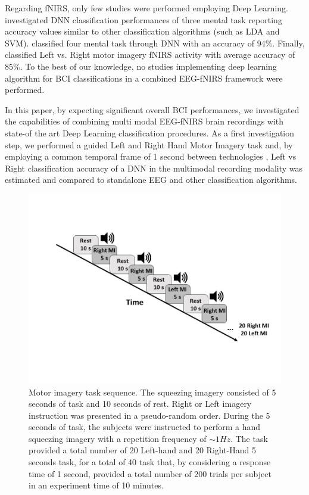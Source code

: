 \documentclass[12pt]{iopart}
\begin{document}
Regarding fNIRS, only  few  studies were performed employing Deep Learning.  \textcite{hennrich2015investigating} investigated DNN classification performances of three mental task reporting accuracy values similar  to other classification algorithms (such as LDA and SVM).  \textcite{abibullaev2011neural} classified four mental task through DNN with an accuracy of $94\%$. Finally, \textcite{nguyen2013temporal} classified Left vs. Right motor imagery fNIRS activity with average accuracy of $85\%$. To the best of our knowledge, no studies implementing deep learning algorithm for BCI classifications  in a combined EEG-fNIRS framework were performed.

In this paper, by expecting significant overall BCI performances,  we investigated the capabilities of combining multi modal EEG-fNIRS brain recordings  with state-of the art Deep Learning classification procedures. As a first investigation step, we performed a guided Left and Right Hand Motor Imagery task \parencite{pfurtscheller1997motor} and, by employing a common temporal frame of 1 second between technologies \parencite{govindan2016novel}, Left vs Right classification accuracy of a DNN in the multimodal recording modality was estimated and compared to standalone EEG and other classification algorithms. 

\begin{figure}
	\includegraphics[width=\linewidth]{Slide1.JPG}
	\caption{ Motor imagery task sequence. The 
		squeezing imagery consisted of 5 seconds of task and 10 seconds of rest. Right or Left imagery instruction was presented in a pseudo-random order.  During the 5 seconds of task, the subjects were instructed to perform a hand squeezing imagery with a repetition frequency of $\sim1Hz$. The task provided a total number of 20 Left-hand and 20 Right-Hand 5 seconds task, for a total of 40 task that, by considering a response time of 1 second, provided a total number of 200 trials per subject in an experiment time of 10 minutes.}
	\label{fig:fig1}
\end{figure}
\end{document}
